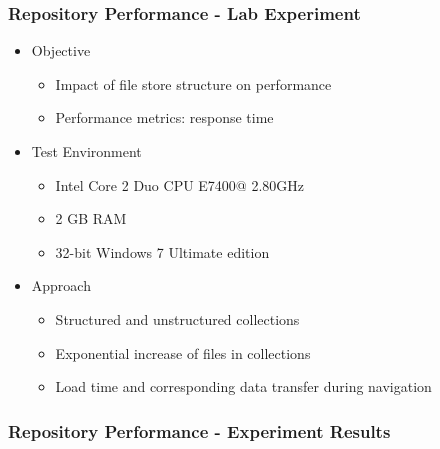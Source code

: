 \documentclass[xcolor=dvitex,t,11pt]{beamer}
\begin{document}
\begin{frame}[fragile]
\frametitle{Repository Performance - Lab Experiment}
\begin{itemize}
\item Objective
\begin{itemize}
\item Impact of file store structure on performance
\item Performance metrics: response time
\end{itemize}
\item Test Environment
\begin{itemize}
\item Intel Core 2 Duo CPU E7400@ 2.80GHz
\item 2 GB RAM
\item 32-bit Windows 7 Ultimate edition
\end{itemize} 
\item Approach
\begin{itemize}
\item Structured and unstructured collections
\item Exponential increase of files in collections
\item Load time and corresponding data transfer during navigation
\end{itemize}
\end{itemize}
\end{frame}


\begin{frame}[fragile]
\frametitle{Repository Performance - Experiment Results}
\centering

\end{frame}
\end{document}
